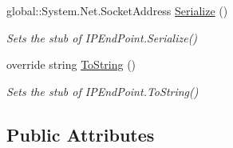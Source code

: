 \begin{DoxyCompactItemize}
global\-::\-System.\-Net.\-Socket\-Address \hyperlink{class_system_1_1_net_1_1_fakes_1_1_stub_i_p_end_point_a8a68210f6ebb4ea75056159801093186}{Serialize} ()
\begin{DoxyCompactList}\small\item\em Sets the stub of I\-P\-End\-Point.\-Serialize()\end{DoxyCompactList}\item 
override string \hyperlink{class_system_1_1_net_1_1_fakes_1_1_stub_i_p_end_point_aeb4358f20a6f658ed42d0229781e6383}{To\-String} ()
\begin{DoxyCompactList}\small\item\em Sets the stub of I\-P\-End\-Point.\-To\-String()\end{DoxyCompactList}\end{DoxyCompactItemize}
\subsection*{Public Attributes}
